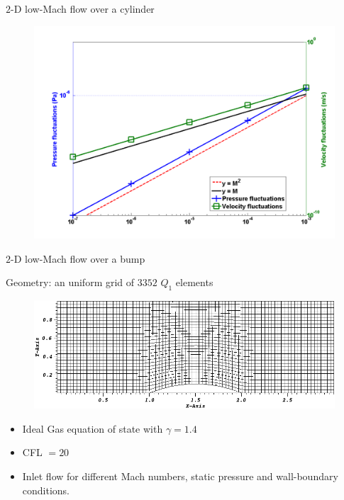 \documentclass[xcolor=dvipsnames,10pt]{beamer}
\begin{document}
\begin{frame}{$2$-D low-Mach flow over a cylinder}
\begin{figure}[H]
\centering
\includegraphics[width=\textwidth]{../figures/pressure_fluctuation.png}
\end{figure}
\end{frame}
\begin{frame}{$2$-D low-Mach flow over a bump}
\begin{block}{Geometry: an uniform grid of $3352$ $Q_1$ elements}
\begin{figure}[H]
\centering
\includegraphics[width=\textwidth]{../figures/Hump2D_geometry.png}
\end{figure}    
\end{block}
\begin{block}{}
\begin{itemize}
\item Ideal Gas equation of state with $\gamma = 1.4$
\item CFL $= 20$
\item Inlet flow for different Mach numbers, static pressure and wall-boundary conditions.
\end{itemize}
\end{block}
\end{frame}
\end{document}
